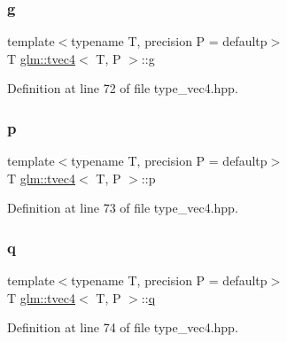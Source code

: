 \mbox{\label{structglm_1_1tvec4_a6a4bfbcc21a945872fff820661a84669}} 
\subsubsection{\texorpdfstring{g}{g}}
{\footnotesize\ttfamily template$<$typename T, precision P = defaultp$>$ \\
T \mbox{\hyperlink{structglm_1_1tvec4}{glm\+::tvec4}}$<$ T, P $>$\+::\mbox{\hyperlink{glad_8h_a9cd653b1648845554169fbc3a3f6d37a}{g}}}



Definition at line 72 of file type\+\_\+vec4.\+hpp.

\mbox{\label{structglm_1_1tvec4_a97852a5b9ca0179197ecfd9a43fb977f}} 
\subsubsection{\texorpdfstring{p}{p}}
{\footnotesize\ttfamily template$<$typename T, precision P = defaultp$>$ \\
T \mbox{\hyperlink{structglm_1_1tvec4}{glm\+::tvec4}}$<$ T, P $>$\+::p}



Definition at line 73 of file type\+\_\+vec4.\+hpp.

\mbox{\label{structglm_1_1tvec4_a9f1e124aa9bb942f1db4b72d0d7c7569}} 
\subsubsection{\texorpdfstring{q}{q}}
{\footnotesize\ttfamily template$<$typename T, precision P = defaultp$>$ \\
T \mbox{\hyperlink{structglm_1_1tvec4}{glm\+::tvec4}}$<$ T, P $>$\+::\mbox{\hyperlink{glad_8h_a514729309336df22bcc8eda979d6ced4}{q}}}



Definition at line 74 of file type\+\_\+vec4.\+hpp.

\mbox{\label{structglm_1_1tvec4_a73501d811cd6e9d4a3cce708445cace5}} 
